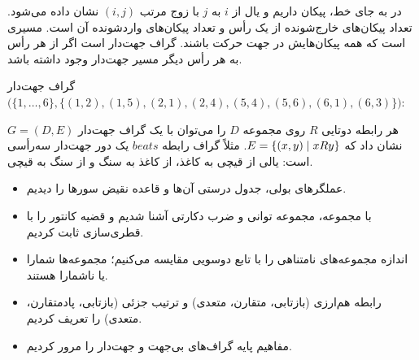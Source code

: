 \begin{definition}
در  به جای خط، پیکان داریم و یال از $i$ به $j$ با زوج مرتب $(i,j)$ نشان داده می‌شود. تعداد پیکان‌های خارج‌شونده از یک رأس  و تعداد پیکان‌های واردشونده  آن است.  مسیری است که همه پیکان‌هایش در جهت حرکت باشند. گراف جهت‌دار  است اگر از هر رأس به هر رأس دیگر مسیر جهت‌دار وجود داشته باشد.
\end{definition}

\begin{example}
گراف جهت‌دار $\big(\{1,\dots,6\},\{(1,2),(1,5),(2,1),(2,4),(5,4),(5,6),(6,1),(6,3)\}\big)$:
\begin{ltrfig}
\end{ltrfig}
\end{example}

هر رابطه دوتایی $R$ روی مجموعه $D$ را می‌توان با یک گراف جهت‌دار $G=(D,E)$ نشان داد که $E=\{(x,y)\mid xRy\}$. مثلاً گراف رابطه $\mathit{beats}$ یک دور جهت‌دار سه‌رأسی است: یالی از قیچی به کاغذ، از کاغذ به سنگ و از سنگ به قیچی.

\begin{summary}
\begin{itemize}
\item عملگرهای بولی، جدول درستی آن‌ها و قاعده نقیض سورها را دیدیم.
\item با مجموعه، مجموعه توانی و ضرب دکارتی آشنا شدیم و قضیه کانتور را با قطری‌سازی ثابت کردیم.
\item اندازه مجموعه‌های نامتناهی را با تابع دوسویی مقایسه می‌کنیم؛ مجموعه‌ها شمارا یا ناشمارا هستند.
\item رابطه هم‌ارزی (بازتابی، متقارن، متعدی) و ترتیب جزئی (بازتابی، پادمتقارن، متعدی) را تعریف کردیم.
\item مفاهیم پایه گراف‌های بی‌جهت و جهت‌دار را مرور کردیم.
\end{itemize}
\end{summary}

